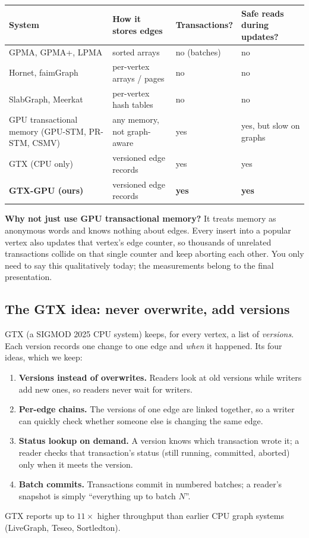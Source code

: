 \documentclass[11pt,a4paper]{article}
\begin{document}
\begin{center}
\renewcommand{\arraystretch}{1.15}
\begin{tabular}{@{}>{\raggedright\arraybackslash}p{3.8cm}>{\raggedright\arraybackslash}p{3.6cm}>{\raggedright\arraybackslash}p{2.5cm}>{\raggedright\arraybackslash}p{3.8cm}@{}}
\toprule
System & How it stores edges & Transactions? & Safe reads during updates? \\
\midrule
GPMA, GPMA+, LPMA & sorted arrays & no (batches) & no \\
Hornet, faimGraph & per-vertex arrays / pages & no & no \\
SlabGraph, Meerkat & per-vertex hash tables & no & no \\
GPU transactional memory (GPU-STM, PR-STM, CSMV) & any memory, not graph-aware & yes & yes, but slow on graphs \\
GTX (CPU only) & versioned edge records & yes & yes \\
\textbf{GTX-GPU (ours)} & versioned edge records & \textbf{yes} & \textbf{yes} \\
\bottomrule
\end{tabular}
\end{center}

\textbf{Why not just use GPU transactional memory?} It treats memory as anonymous words and knows nothing about edges.
Every insert into a popular vertex also updates that vertex's edge counter, so thousands of unrelated transactions
collide on that single counter and keep aborting each other. You only need to say this qualitatively today; the
measurements belong to the final presentation.

\subsection{The GTX idea: never overwrite, add versions}
GTX (a SIGMOD 2025 CPU system) keeps, for every vertex, a list of \emph{versions}. Each version records one change to one
edge and \emph{when} it happened. Its four ideas, which we keep:
\begin{enumerate}
\item \textbf{Versions instead of overwrites.} Readers look at old versions while writers add new ones, so readers never
  wait for writers.
\item \textbf{Per-edge chains.} The versions of one edge are linked together, so a writer can quickly check whether
  someone else is changing the same edge.
\item \textbf{Status lookup on demand.} A version knows which transaction wrote it; a reader checks that transaction's
  status (still running, committed, aborted) only when it meets the version.
\item \textbf{Batch commits.} Transactions commit in numbered batches; a reader's snapshot is simply ``everything up to
  batch $N$''.
\end{enumerate}
GTX reports up to $11\times$ higher throughput than earlier CPU graph systems (LiveGraph, Teseo, Sortledton).
\end{document}
